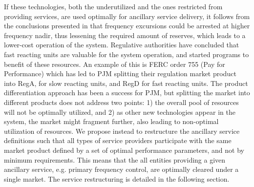 If these technologies, both the underutilized and the ones restricted from providing services, are used optimally for ancillary service delivery, it follows from the conclusions presented in \cite{makarov2008assessing,vrettos2015integrating} that frequency excursions could be arrested at higher frequency nadir, thus lessening the required amount of reserves, which leads to a lower-cost operation of the system.
Regulative authorities have concluded that fast reacting units are valuable for the system operation, and started programs to benefit of these resources. An example of this is FERC order 755 (Pay for Performance) which has led to PJM splitting their regulation market product into RegA, for slow reacting units, and RegD for fast reacting units. The product differentiation approach has been a success for PJM, but splitting the market into different products does not address two points: 1) the overall pool of resources will not be optimally utilized, and 2) as other new technologies appear in the system, the market might fragment further, also leading to non-optimal utilization of resources.  We propose instead to restructure the ancillary service definitions such that all types of service providers participate with the same market product defined by a set of optimal performance parameters, and not by minimum requirements. This means that the all entities providing a given ancillary service, e.g. primary frequency control, are optimally cleared under a single market. The service restructuring is detailed in the following section.
